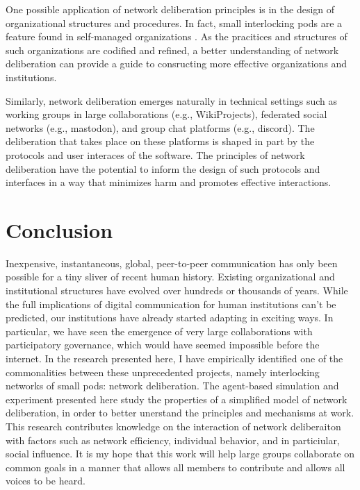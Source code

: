 One possible application of network deliberation principles is in the design of organizational structures and procedures.
In fact, small interlocking pods are a feature found in self-managed organizations \cite{laloux_reinventing_2014}.
As the pracitices and structures of such organizations are codified and refined, a better understanding of network deliberation can provide a guide to consructing more effective organizations and institutions.

Similarly, network deliberation emerges naturally in technical settings such as working groups in large collaborations (e.g., WikiProjects), federated social networks (e.g., mastodon), and group chat platforms (e.g., discord).
The deliberation that takes place on these platforms is shaped in part by the protocols and user interaces of the software.
The principles of network deliberation have the potential to inform the design of such protocols and interfaces in a way that minimizes harm and promotes effective interactions.

\section{Conclusion}
Inexpensive, instantaneous, global, peer-to-peer communication has only been possible for a tiny sliver of recent human history.
Existing organizational and institutional structures have evolved over hundreds or thousands of years.
While the full implications of digital communication for human institutions can't be predicted, our institutions have already started adapting in exciting ways.
In particular, we have seen the emergence of very large collaborations with participatory governance, which would have seemed impossible before the internet.
In the research presented here, I have empirically identified one of the commonalities between these unprecedented projects, namely interlocking networks of small pods: network deliberation.
The agent-based simulation and experiment presented here study the properties of a simplified model of network deliberation, in order to better unerstand the principles and mechanisms at work.
This research contributes knowledge on the interaction of network deliberaiton with factors such as network efficiency, individual behavior, and in particiular, social influence.
It is my hope that this work will help large groups collaborate on common goals in a manner that allows all members to contribute and allows all voices to be heard.
